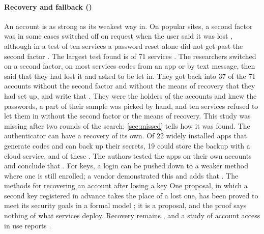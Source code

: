 \paragraph{Recovery and fallback ()}
An account is as strong as its weakest way in.
On popular sites, a second factor was in some cases switched off on
request when the user said it was lost \autocite{Gerlitz2023Recovery},
although in a test of ten services a password reset alone did not get
past the second factor \autocite{Buttner2025Inconsistencies}.
The largest test found is of 71 services
\autocite{Klivan2023Recovery}.
The researchers switched on a second factor, on most services codes
from an app or by text message, then said that they had lost it and
asked to be let in.
They got back into 37 of the 71 accounts without the second factor and
without the means of recovery that they had set up, and write that
.
They were the holders of the accounts and knew the passwords, a part of
their sample was picked by hand, and ten services refused to let them
in without the second factor or the means of recovery.
This study was missing after two rounds of the search;
\cref{sec:missed} tells how it was found.
The authenticator can have a recovery of its own.
Of 22 widely installed apps that generate codes and can back up their
secrets, 19 could store the backup with a cloud service, and of these
.
The authors tested the apps on their own accounts and conclude that
.
For keys, a login can be pushed down to a weaker method where one is
still enrolled; a vendor demonstrated this and adds that
.
The methods for recovering an account after losing a key
One proposal, in which a second key registered in advance takes the
place of a lost one, has been proved to meet its security goals in a
formal model \autocite[abstract; \abso]{Frymann2020ARKG}; it is a
proposal, and the proof says nothing of what services deploy.
Recovery remains
, and a study of account access in use reports
.

